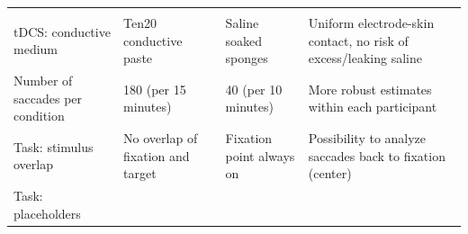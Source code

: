 \documentclass[11pt,english,]{memoir}
\begin{document}
\begin{longtable}[]{@{}llll@{}}
\begin{minipage}[t]{0.38\columnwidth}
\end{minipage}\tabularnewline
\begin{minipage}[t]{0.14\columnwidth}\raggedright
tDCS: conductive medium\strut
\end{minipage} & \begin{minipage}[t]{0.21\columnwidth}\raggedright
Ten20 conductive paste\strut
\end{minipage} & \begin{minipage}[t]{0.16\columnwidth}\raggedright
Saline soaked sponges\strut
\end{minipage} & \begin{minipage}[t]{0.38\columnwidth}\raggedright
Uniform electrode-skin contact, no risk of excess/leaking saline\strut
\end{minipage}\tabularnewline
\begin{minipage}[t]{0.14\columnwidth}\raggedright
Number of saccades per condition\strut
\end{minipage} & \begin{minipage}[t]{0.21\columnwidth}\raggedright
180 (per 15 minutes)\strut
\end{minipage} & \begin{minipage}[t]{0.16\columnwidth}\raggedright
40 (per 10 minutes)\strut
\end{minipage} & \begin{minipage}[t]{0.38\columnwidth}\raggedright
More robust estimates within each participant\strut
\end{minipage}\tabularnewline
\begin{minipage}[t]{0.14\columnwidth}\raggedright
Task: stimulus overlap\strut
\end{minipage} & \begin{minipage}[t]{0.21\columnwidth}\raggedright
No overlap of fixation and target\strut
\end{minipage} & \begin{minipage}[t]{0.16\columnwidth}\raggedright
Fixation point always on\strut
\end{minipage} & \begin{minipage}[t]{0.38\columnwidth}\raggedright
Possibility to analyze saccades back to fixation (center)\strut
\end{minipage}\tabularnewline
\begin{minipage}[t]{0.14\columnwidth}\raggedright
Task: placeholders\strut
\end{minipage} & \begin{minipage}[t]{0.21\columnwidth}\raggedright

\end{minipage}
\end{longtable}
\end{document}
